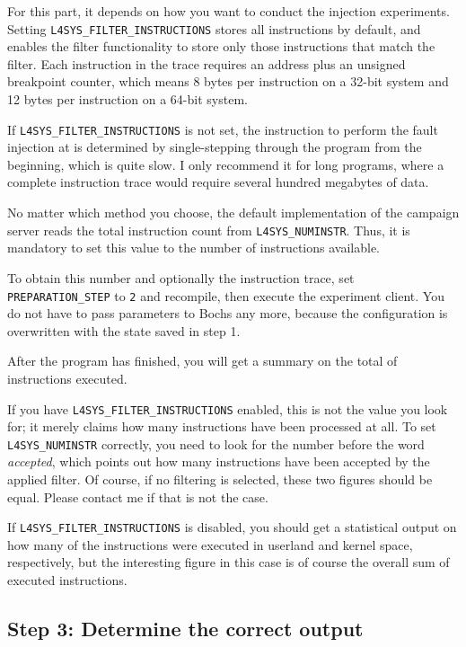 \documentclass[a4paper,10pt]{article}
\begin{document}
For this part, it depends on how you want to conduct the injection
experiments. Setting \verb+L4SYS_FILTER_INSTRUCTIONS+
stores all instructions by default, and
enables the filter functionality to store only those
instructions that match the filter.
Each instruction in the trace requires
an address plus an unsigned breakpoint counter,
which means 8 bytes per instruction on a 32-bit system
and 12 bytes per instruction on a 64-bit system.

If \verb+L4SYS_FILTER_INSTRUCTIONS+ is not set, the instruction
to perform the fault injection at is determined by single-stepping
through the program from the beginning, which is quite slow.
I only recommend it for long programs, where a complete
instruction trace would require several hundred megabytes of data.

No matter which method you choose, the default implementation
of the campaign server reads the total instruction count
from \verb+L4SYS_NUMINSTR+. Thus, it is mandatory to set this
value to the number of instructions available.

To obtain this number and optionally the instruction trace,
set \verb+PREPARATION_STEP+ to \texttt{2} and recompile, then execute
the experiment client. You do not have to pass parameters to Bochs
any more, because the configuration is overwritten with the
state saved in step 1.

After the program has finished, you will get a summary on the
total of instructions executed.

If you have
\verb+L4SYS_FILTER_INSTRUCTIONS+ enabled, this is not the
value you look for; it merely claims how many
instructions have been processed at all.
To set \verb+L4SYS_NUMINSTR+ correctly, you need to look for the
number before the word \emph{accepted}, which points out how many
instructions have been accepted by the applied filter. Of course,
if no filtering is selected, these two figures should be equal.
Please contact me if that is not the case.

If \verb+L4SYS_FILTER_INSTRUCTIONS+ is disabled, you should
get a statistical output on how many of the instructions
were executed in userland and kernel space, respectively,
but the interesting figure in this case is of course the overall
sum of executed instructions.

\subsection{Step 3: Determine the correct output}
\end{document}
